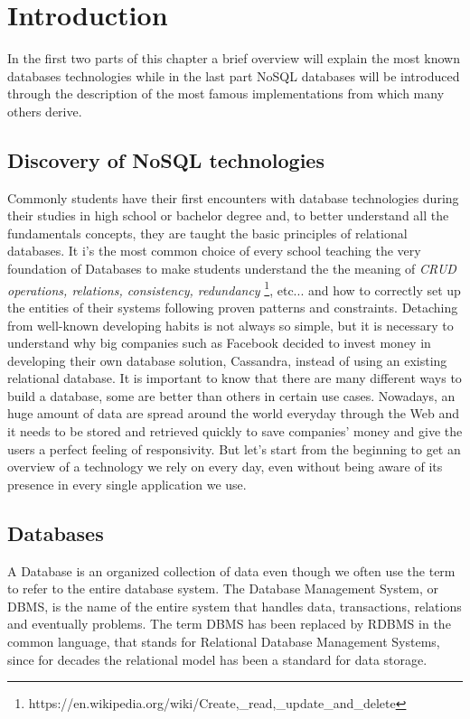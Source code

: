\chapter{Introduction}
\label{cha:intro}

In the first two parts of this chapter a brief overview will explain the most known databases technologies while in the last part NoSQL databases will be introduced through the description of the most famous implementations from which many others derive.


\section{Discovery of NoSQL technologies}
\label{sec:context}

Commonly students have their first encounters with database technologies during their studies in high school or bachelor degree and, to better understand all the fundamentals concepts, they are taught the basic principles of relational databases.
It i’s the most common choice of every school teaching the very foundation of Databases to make students understand the the meaning of \textit{CRUD operations, relations, consistency, redundancy} \footnote{https://en.wikipedia.org/wiki/Create,\_read,\_update\_and\_delete}, etc... and how to correctly set up the entities of their systems following proven patterns and constraints.
Detaching from well-known developing habits is not always so simple, but it is necessary to understand why big companies such as Facebook decided to invest money in developing their own database solution, Cassandra, instead of using an existing relational database.
It is important to know that there are many different ways to build a database, some are better than others in certain use cases. Nowadays, an huge amount of data are spread around the world everyday through the Web and it needs to be stored and retrieved quickly to save companies' money and give the users a perfect feeling of responsivity\cite{}.
But let’s start from the beginning to get an overview of a technology we rely on every day, even without being aware of its presence in every single application we use.


\section{Databases}
\label{sec:problem}

A Database is an organized collection of data even though we often use the term to refer to the entire database system. The Database Management System, or DBMS, is the name of the entire system that handles data, transactions, relations and eventually problems.
The term DBMS has been replaced by RDBMS in the common language, that stands for Relational Database Management Systems, since for decades the relational model has been a standard for data storage.



